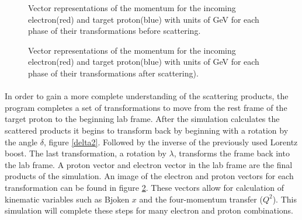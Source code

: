 \begin{figure}[]
  \centering
  \quad
  \centering
  \vspace{0.25cm}
  \centering
  \quad
  \centering
   \vspace{0.25cm} 
  \caption{Vector representations of the momentum for the incoming electron(red) and  target proton(blue) with units of GeV for each phase of their transformations before scattering.}
  \label{transform}
  \end{figure}
  \begin{figure}[p!]
	\centering
	\quad
	\centering
	\vspace{0.25cm}
	\centering
	\quad
	\centering
	\vspace{0.25cm}	
	\caption{Vector representations of the momentum for the incoming electron(red) and  target proton(blue) with units of GeV for each phase of their transformations after scattering).}
	\label{transform2}
\end{figure}

  \paragraph{}
  In order to gain a more complete understanding of the scattering products, the program completes a set of transformations to move from the rest frame of the target proton to the beginning lab frame. After the simulation calculates the scattered products it begins to transform back by beginning with a rotation by the angle $\delta$, figure \ref{delta2}. Followed by the inverse of the previously used Lorentz boost. The last transformation, a rotation by $\lambda$, transforms the frame back into the lab frame. A proton vector and electron vector in the lab frame are the final products of the simulation. An image of the electron and proton vectors for each transformation can be found in figure \ref{transform2}. These vectors allow for calculation of kinematic variables such as Bjoken $x$ and the four-momentum transfer ($Q^2$).  This simulation will complete these steps for many electron and proton combinations.


